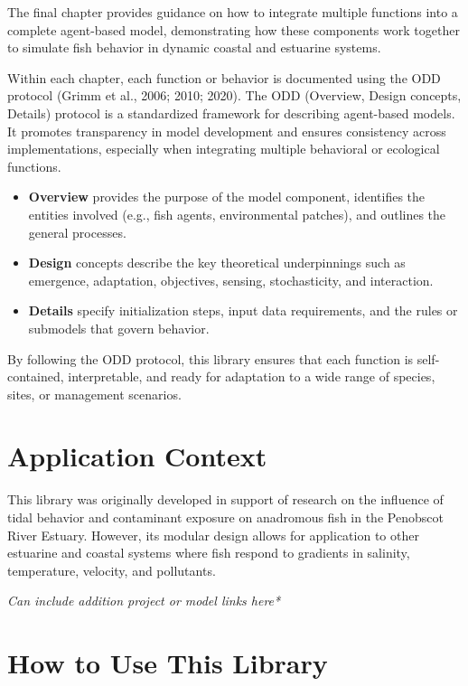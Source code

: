 \documentclass[
]{book}
\begin{document}
The final chapter provides guidance on how to integrate multiple functions into a complete agent-based model, demonstrating how these components work together to simulate fish behavior in dynamic coastal and estuarine systems.

Within each chapter, each function or behavior is documented using the ODD protocol (Grimm et al., 2006; 2010; 2020). The ODD (Overview, Design concepts, Details) protocol is a standardized framework for describing agent-based models. It promotes transparency in model development and ensures consistency across implementations, especially when integrating multiple behavioral or ecological functions.

\begin{itemize}
\item
  \textbf{Overview} provides the purpose of the model component, identifies the entities involved (e.g., fish agents, environmental patches), and outlines the general processes.
\item
  \textbf{Design} concepts describe the key theoretical underpinnings such as emergence, adaptation, objectives, sensing, stochasticity, and interaction.
\item
  \textbf{Details} specify initialization steps, input data requirements, and the rules or submodels that govern behavior.
\end{itemize}

By following the ODD protocol, this library ensures that each function is self-contained, interpretable, and ready for adaptation to a wide range of species, sites, or management scenarios.

\section{Application Context}\label{application-context}

This library was originally developed in support of research on the influence of tidal behavior and contaminant exposure on anadromous fish in the Penobscot River Estuary. However, its modular design allows for application to other estuarine and coastal systems where fish respond to gradients in salinity, temperature, velocity, and pollutants.

\emph{Can include addition project or model links here*}

\section{How to Use This Library}\label{how-to-use-this-library}
\end{document}
